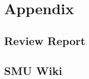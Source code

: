 \section*{Appendix}
\renewcommand*\thesubsection{\Roman{subsection}} %


\subsection{Review Report}
\subsection{SMU Wiki}
\newpage

